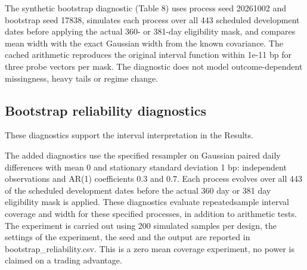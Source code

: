 \documentclass[11pt,a4paper]{article}
\begin{document}
The synthetic bootstrap diagnostic (Table 8) uses process seed 20261002 and bootstrap seed 17838, simulates each process over all 443 scheduled development dates before applying the actual 360- or 381-day eligibility mask, and compares mean width with the exact Gaussian width from the known covariance. The cached arithmetic reproduces the original interval function within 1e-11 bp for three probe vectors per mask. The diagnostic does not model outcome-dependent missingness, heavy tails or regime change.

\subsection*{Bootstrap reliability diagnostics}

These diagnostics support the interval interpretation in the Results.

The added diagnostics use the specified resampler on Gaussian paired daily differences with mean 0 and stationary standard deviation 1 bp: independent observations and AR(1) coefficients 0.3 and 0.7. Each process evolves over all 443 of the scheduled development dates before the actual 360 day or 381 day eligibility mask is applied. These diagnostics evaluate repeated\allowbreak{}sample interval coverage and width for these specified processes, in addition to arithmetic tests. The experiment is carried out using 200 simulated samples per design, the settings of the experiment, the seed and the output are reported in bootstrap\_reliability.csv. This is a zero mean coverage experiment, no power is claimed on a trading advantage.
\end{document}
